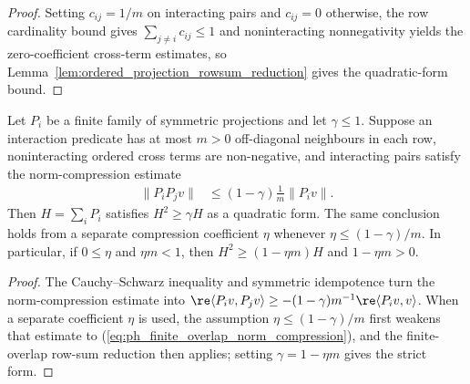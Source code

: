 \begin{proof}
    \leanok
    Setting $c_{ij}=1/m$ on interacting pairs and $c_{ij}=0$ otherwise, the row
    cardinality bound gives $\sum_{j\ne i}c_{ij}\le1$ and noninteracting
    nonnegativity yields the zero-coefficient cross-term estimates, so
    Lemma~\ref{lem:ordered_projection_rowsum_reduction} gives the
    quadratic-form bound.
\end{proof}

\begin{lemma}
    \label{lem:finite_overlap_projection_norm_reduction}
    \leanok
    Let $P_i$ be a finite family of symmetric projections and let
    $\gamma\le1$. Suppose an interaction predicate has at most $m>0$
    off-diagonal neighbours in each row, noninteracting ordered cross terms are
    non-negative, and interacting pairs satisfy the norm-compression estimate
    \begin{align}
        \|P_iP_jv\|
         & \le(1-\gamma)\frac{1}{m}\|P_iv\|.
        \label{eq:ph_finite_overlap_norm_compression}
    \end{align}
    Then $H=\sum_iP_i$ satisfies $H^2\ge\gamma H$ as a quadratic form. The same
    conclusion holds from a separate compression coefficient $\eta$ whenever
    $\eta\le(1-\gamma)/m$. In particular, if $0\le\eta$ and $\eta m<1$, then
    $H^2\ge(1-\eta m)H$ and $1-\eta m>0$.
\end{lemma}

\begin{proof}
    \leanok
    The Cauchy--Schwarz inequality and symmetric idempotence turn the
    norm-compression estimate into
    $\re\langle P_i v,P_jv\rangle
        \ge-(1-\gamma)m^{-1}\re\langle P_iv,v\rangle$.
    When a separate coefficient $\eta$ is used, the assumption
    $\eta\le(1-\gamma)/m$ first weakens that estimate to
    (\ref{eq:ph_finite_overlap_norm_compression}), and the finite-overlap
    row-sum reduction then applies; setting $\gamma=1-\eta m$ gives the strict
    form.
\end{proof}
